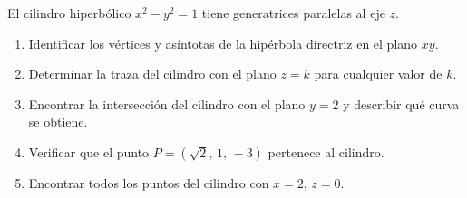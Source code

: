 El cilindro hiperbólico $x^2 - y^2 = 1$ tiene generatrices paralelas al eje $z$.
\begin{enumerate}
    \item Identificar los vértices y asíntotas de la hipérbola directriz en el plano $xy$.
    \item Determinar la traza del cilindro con el plano $z = k$ para cualquier valor de $k$.
    \item Encontrar la intersección del cilindro con el plano $y = 2$ y describir qué curva se obtiene.
    \item Verificar que el punto $P = (\sqrt{2},\, 1,\, -3)$ pertenece al cilindro.
    \item Encontrar todos los puntos del cilindro con $x = 2$, $z = 0$.
\end{enumerate}